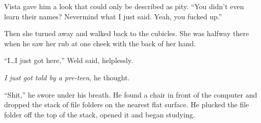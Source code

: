 Vista gave him a look that could only be described as pity.  ``You didn't even learn their names?  Nevermind what I just said.  Yeah, you fucked up.''



Then she turned away and walked back to the cubicles.  She was halfway there when he saw her rub at one cheek with the back of her hand.



``I\ldots I just got here,'' Weld said, helplessly.



\emph{I just got told by a pre-teen}, he thought.



``Shit,'' he swore under his breath.  He found a chair in front of the computer and dropped the stack of file folders on the nearest flat surface.  He plucked the file folder off the top of the stack, opened it and began studying.
